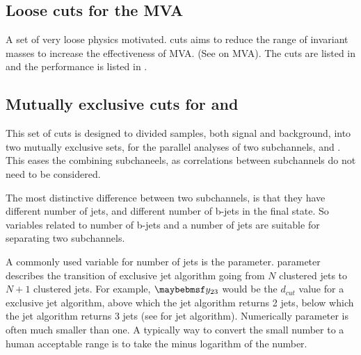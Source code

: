 \begin{table}[!tbp]
\caption[Pre-selection efficiency at ]%
{List of signal and background samples with the corresponding expected number at  , assuming a luminosity of 1500\,$fb^{-1}$. The selection efficiencies are presented in a ``flow'' fashion, as the every selection cut contains all the cuts to the left of it.}
\label{tab:doubleHiggs1.4TeVPreslection}
\end{table}




\subsection{Loose cuts for the MVA}

A set of very loose physics motivated. cuts aims to reduce the range of invariant masses to increase the effectiveness of MVA. (See \Section{} on MVA). The cuts are listed in  and the performance is listed in .


\subsection{Mutually exclusive cuts for \eeToHHbbWW and \eeToHHbbbb}
\label{sec:doubleHiggsMutualExclusive}
This set of cuts is designed to   divided samples, both signal and background, into two mutually exclusive sets, for the parallel analyses of  two subchannels, \eeToHHbbWWHad and \eeToHHbbbb. This eases the combining subchaneels, as correlations between subchannels do not need to be considered.

The most distinctive difference between two subchannels, is that they have different number of jets, and different number of b-jets in the final state. So variables related to number of b-jets and a number of jets are suitable for separating two subchannels.

A commonly used variable for number of jets is the \y{} parameter. \y{} parameter describes the transition of exclusive jet algorithm going from $N$ clustered jets to $N\!+\!1$ clustered jets. For example, $\y{23}$ would be the $d_{cut}$ value for a exclusive jet algorithm, above which the jet algorithm returns 2 jets, below which the jet algorithm returns 3 jets (see  for jet algorithm). Numerically \y{} parameter is often much smaller than one. A typically way to convert the small number to a human acceptable range is to take the minus logarithm of the number.

